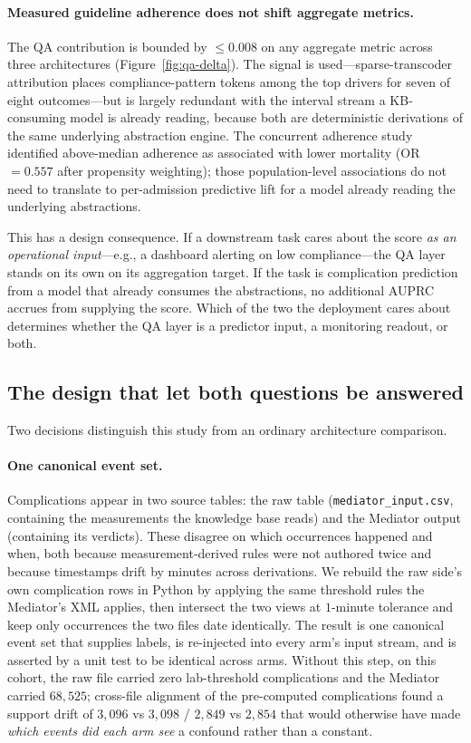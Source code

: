 \paragraph{Measured guideline adherence does not shift aggregate
metrics.}
The QA contribution is bounded by $\le 0.008$ on any aggregate metric
across three architectures (Figure~\ref{fig:qa-delta}). The signal is
used---sparse-transcoder attribution places compliance-pattern tokens
among the top drivers for seven of eight outcomes---but is largely
redundant with the interval stream a KB-consuming model is already
reading, because both are deterministic derivations of the same
underlying abstraction engine. The concurrent adherence study
\citep{oded2027kineret-jbi} identified above-median adherence as
associated with lower mortality (OR $=0.557$ after propensity
weighting); those population-level associations do not need to
translate to per-admission predictive lift for a model already reading
the underlying abstractions.

This has a design consequence. If a downstream task cares about the
score \emph{as an operational input}---e.g., a dashboard alerting on
low compliance---the QA layer stands on its own on its aggregation
target. If the task is complication prediction from a model that
already consumes the abstractions, no additional AUPRC accrues from
supplying the score. Which of the two the deployment cares about
determines whether the QA layer is a predictor input, a monitoring
readout, or both.

\subsection{The design that let both questions be answered}

Two decisions distinguish this study from an ordinary architecture
comparison.

\paragraph{One canonical event set.}
Complications appear in two source tables: the raw table
(\texttt{mediator\_input.csv}, containing the measurements the
knowledge base reads) and the Mediator output (containing its verdicts).
These disagree on which occurrences happened and when, both because
measurement-derived rules were not authored twice and because timestamps
drift by minutes across derivations. We rebuild the raw side's own
complication rows in Python by applying the same threshold rules the
Mediator's XML applies, then intersect the two views at $1$-minute
tolerance and keep only occurrences the two files date identically. The
result is one canonical event set that supplies labels, is re-injected
into every arm's input stream, and is asserted by a unit test to be
identical across arms. Without this step, on this cohort, the raw file
carried zero lab-threshold complications and the Mediator carried
$68{,}525$; cross-file alignment of the pre-computed complications
found a support drift of $3{,}096$ vs $3{,}098$ / $2{,}849$ vs $2{,}854$
that would otherwise have made \emph{which events did each arm see} a
confound rather than a constant.

